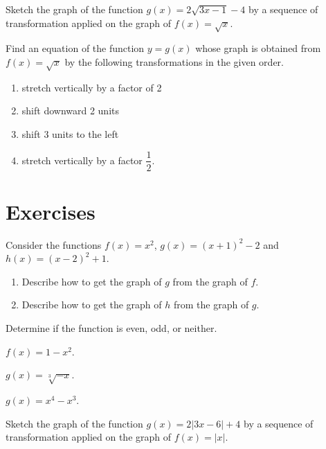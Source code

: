 \newpage
\begin{example}
Sketch the graph of the function $g(x)=2\sqrt{3x-1}-4$ by a sequence of transformation applied on the graph of $f(x)=\sqrt{x}$.  
\end{example}

\begin{example}
  Find an equation of the function $y=g(x)$ whose graph is obtained from $f(x)=\sqrt{x}$ by the following transformations in the given order.
  \begin{enumerate}
    \item stretch vertically by a factor of 2
    \item shift downward 2 units
    \item shift 3 units to the left
    \item stretch vertically by a factor $\dfrac{1}{2}$.
  \end{enumerate}
\end{example}

\newpage

\section*{Exercises}

\begin{exercise}
    Consider the functions $f(x)=x^2$, $g(x)=(x+1)^2-2$ and $h(x)=(x-2)^2+1$.
    \begin{enumerate}
      \item Describe how to get the graph of $g$ from the graph of $f$.
      \item Describe how to get the graph of $h$ from the graph of $g$.
    \end{enumerate}
\end{exercise}

\begin{exercise}
    Determine if the function is even, odd, or neither.\\
    \begin{enumerate*}
      \item $f(x)=1-x^2$.
      \item $g(x)=\sqrt[3]{-x}$.
      \item $g(x)=x^4-x^3$.
      \hfill\mbox{}
    \end{enumerate*}  
\end{exercise}

\newpage

\begin{exercise}
  Sketch the graph of the function $g(x)=2|3x-6| + 4$ by a sequence of transformation applied on the graph of $f(x)=|x|$.  
\end{exercise}

